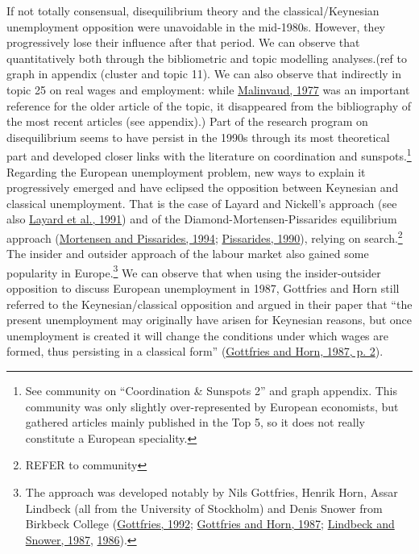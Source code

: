 \documentclass[]{elsarticle} %
\begin{document}
If not totally consensual, disequilibrium theory and the
classical/Keynesian unemployment opposition were unavoidable in the
mid-1980s. However, they progressively lose their influence after that
period. We can observe that quantitatively both through the bibliometric
and topic modelling analyses.(ref to graph in appendix (cluster and
topic 11). We can also observe that indirectly in topic 25 on real wages
and employment: while \protect\hyperlink{ref-malinvaud1977}{Malinvaud,
1977} was an important reference for the older article of the topic, it
disappeared from the bibliography of the most recent articles (see
appendix).) Part of the research program on disequilibrium seems to have
persist in the 1990s through its most theoretical part and developed
closer links with the literature on coordination and
sunspots.\footnote{See community on ``Coordination \& Sunspots 2'' and
  graph appendix. This community was only slightly over-represented by
  European economists, but gathered articles mainly published in the Top
  5, so it does not really constitute a European speciality.} Regarding
the European unemployment problem, new ways to explain it progressively
emerged and have eclipsed the opposition between Keynesian and classical
unemployment. That is the case of Layard and Nickell's approach (see
also \protect\hyperlink{ref-layard1991a}{Layard et al., 1991}) and of
the Diamond-Mortensen-Pissarides equilibrium approach
(\protect\hyperlink{ref-mortensen1994}{Mortensen and Pissarides, 1994};
\protect\hyperlink{ref-pissarides1990}{Pissarides, 1990}), relying on
search.\footnote{REFER to community} The insider and outsider approach
of the labour market also gained some popularity in Europe.\footnote{The
  approach was developed notably by Nils Gottfries, Henrik Horn, Assar
  Lindbeck (all from the University of Stockholm) and Denis Snower from
  Birkbeck College (\protect\hyperlink{ref-gottfries1992}{Gottfries,
  1992}; \protect\hyperlink{ref-gottfries1987}{Gottfries and Horn,
  1987}; \protect\hyperlink{ref-lindbeck1987a}{Lindbeck and Snower,
  1987}, \protect\hyperlink{ref-lindbeck1986}{1986}).} We can observe
that when using the insider-outsider opposition to discuss European
unemployment in 1987, Gottfries and Horn still referred to the
Keynesian/classical opposition and argued in their paper that ``the
present unemployment may originally have arisen for Keynesian reasons,
but once unemployment is created it will change the conditions under
which wages are formed, thus persisting in a classical form''
(\protect\hyperlink{ref-gottfries1987}{Gottfries and Horn, 1987, p. 2}).
\end{document}
